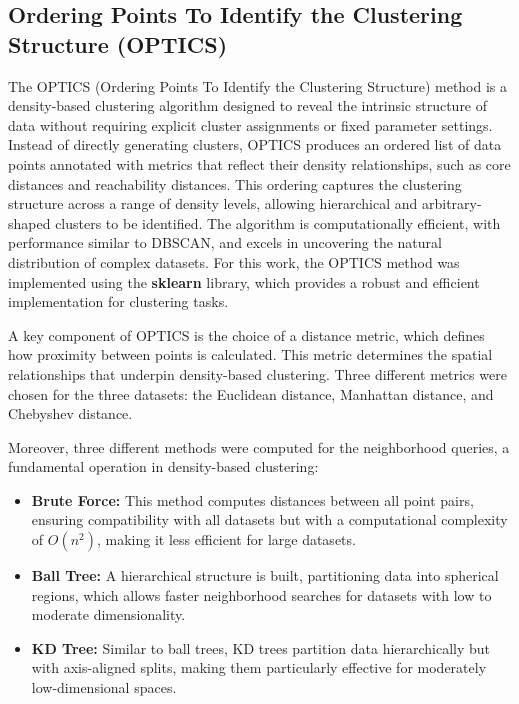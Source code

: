 \subsection{Ordering Points To Identify the Clustering Structure (OPTICS)}

The OPTICS (Ordering Points To Identify the Clustering Structure) method is a density-based clustering algorithm designed
to reveal the intrinsic structure of data without requiring explicit cluster assignments or fixed parameter settings.
Instead of directly generating clusters, OPTICS produces an ordered list of data points annotated with metrics that
reflect their density relationships, such as core distances and reachability distances. This ordering captures the
clustering structure across a range of density levels, allowing hierarchical and arbitrary-shaped clusters to be identified.
The algorithm is computationally efficient, with performance similar to DBSCAN, and excels in uncovering the natural
distribution of complex datasets. For this work, the OPTICS method was implemented using the \textbf{sklearn} library, which provides a robust and efficient implementation for clustering tasks.

A key component of OPTICS is the choice of a distance metric, which defines how proximity between points is calculated.
This metric determines the spatial relationships that underpin density-based clustering. Three different metrics were chosen
for the three datasets: the Euclidean distance, Manhattan distance, and Chebyshev distance.

Moreover, three different methods were computed for the neighborhood queries, a fundamental operation in density-based
clustering:
\begin{itemize}
    \item \textbf{Brute Force:} This method computes distances between all point pairs, ensuring compatibility with all
    datasets but with a computational complexity of $O(n^2)$, making it less efficient for large datasets.
    \item \textbf{Ball Tree:} A hierarchical structure is built, partitioning data into spherical regions, which allows
    faster neighborhood searches for datasets with low to moderate dimensionality.
    \item \textbf{KD Tree:} Similar to ball trees, KD trees partition data hierarchically but with axis-aligned splits,
    making them particularly effective for moderately low-dimensional spaces.
\end{itemize}

